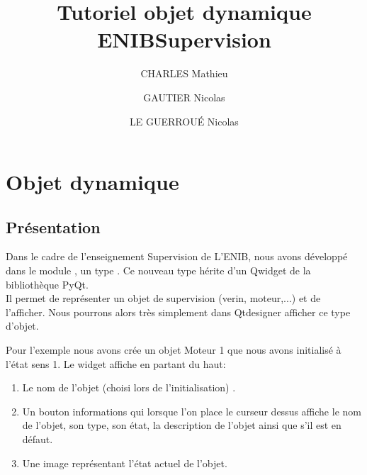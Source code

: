 \documentclass[12pt]{report}    %
\begin{document}
\title{Tutoriel objet dynamique ENIBSupervision}
\author{CHARLES Mathieu \and GAUTIER Nicolas \and LE GUERROUÉ Nicolas}  
\maketitle 
\tableofcontents




\chapter{Objet dynamique}

\section{Présentation}

Dans le cadre de l'enseignement Supervision de L'ENIB, nous avons développé dans le module , un type . Ce nouveau type hérite d'un Qwidget de la bibliothèque PyQt.\\

Il permet de représenter un objet de supervision (verin, moteur,...) et de l'afficher. Nous pourrons alors très simplement dans Qtdesigner afficher ce type d'objet.\\ 


Pour l'exemple nous avons crée un objet Moteur 1 que nous avons initialisé à l'état sens 1. 
Le widget affiche en partant du haut:
\begin{enumerate}
    \item Le nom de l'objet (choisi lors de l'initialisation) .
    \item Un bouton informations qui lorsque l'on place le curseur dessus affiche le nom de l'objet, son type, son état, la description de l'objet ainsi que s'il est en défaut.
    \item Une image représentant l'état actuel de l'objet.
\end{enumerate}\\
\end{document}
